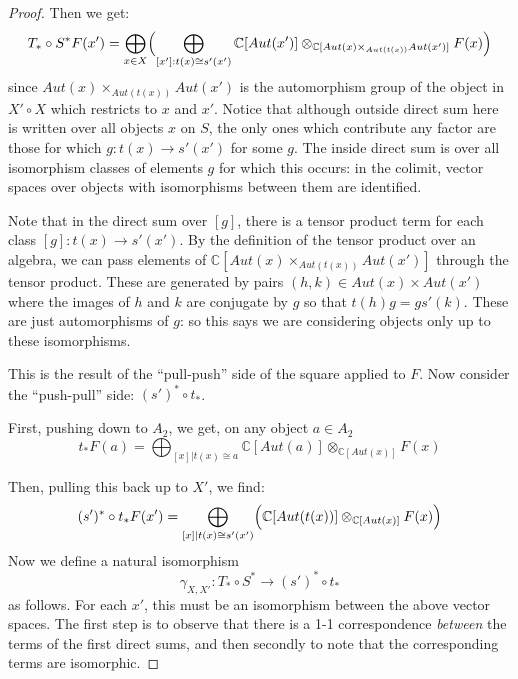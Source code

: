 \documentclass[10pt]{amsart}
\numberwithin{theorem}{subsection}
\newcommand{\ra}{\mathop{\rightarrow}}
\begin{document}
\begin{proof}
Then we get:
\begin{equation}
T_{\ast} \circ S^{\ast} F (x') = \bigoplus_{x \in X} \Bigl{(}
\bigoplus_{[x']: t(x) \cong s'(x')} \mathbb{C}[Aut({x'})]
\otimes_{\mathbb{C}[Aut(x) \times_{Aut(t(x))} Aut({x'})]} F(x) \Bigr{)}
\end{equation}
since $Aut(x) \times_{Aut(t(x))} Aut({x'})$ is the automorphism group of the object in
${X' \circ X}$ which restricts to $x$ and $x'$.  Notice that although outside direct sum here is written over all
objects $x$ on $S$, the only ones which contribute any factor are
those for which $g : t(x) \ra s'(x')$ for some $g$.  The inside
direct sum is over all isomorphism classes of elements $g$ for which
this occurs: in the colimit, vector spaces over objects with
isomorphisms between them are identified.

Note that in the direct sum over $[g]$, there is a tensor product term
for each class $[g]: t(x) \ra s'(x')$.  By the definition of the tensor
product over an algebra, we can pass elements of $\mathbb{C}[Aut(x)
\times_{Aut(t(x))} Aut({x'})]$ through the tensor product.  These are generated
by pairs $(h,k) \in Aut(x) \times Aut({x'})$ where the images of $h$ and $k$
are conjugate by $g$ so that $t(h) g = g s'(k)$.  These are just
automorphisms of $g$: so this says we are considering objects only up
to these isomorphisms.

This is the result of the ``pull-push'' side of the square applied to
$F$.  Now consider the ``push-pull'' side: $(s')^{\ast} \circ t_{\ast}$.

First, pushing down to $A_2$, we get, on any object $a \in A_2$
\begin{equation}
t_{\ast}F(a) = \bigoplus_{[x] | t(x) \cong a} \mathbb{C}[Aut(a)] \otimes_{\mathbb{C}[Aut(x)]}F(x)
\end{equation}

Then, pulling this back up to $X'$, we find:
\begin{equation}
(s')^{\ast} \circ t_{\ast}F(x') = \bigoplus_{[x] | t(x) \cong s'(x')} \Bigl{(} \mathbb{C}[Aut(t(x))] \otimes_{\mathbb{C}[Aut({x})]} F(x)  \Bigr{)}
\end{equation}
Now we define a natural isomorphism
\begin{equation}
\gamma_{X,X'} :  T_{\ast} \circ S^{\ast} \ra (s')^{\ast} \circ t_{\ast}
\end{equation}
as follows.  For each $x'$, this must be an isomorphism between the above vector
spaces.  The first step is to observe that there is a 1-1
correspondence \textit{between} the terms of the first direct sums, and then
secondly to note that the corresponding terms are isomorphic.


\end{proof}
\end{document}
